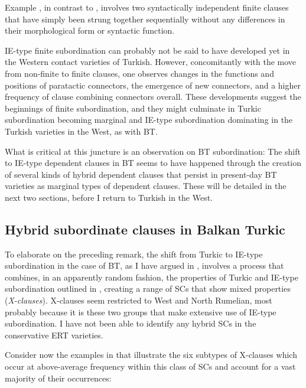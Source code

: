 \documentclass[output=paper,colorlinks,citecolor=brown]{langscibook}
\begin{document}
\noindent
Example , in contrast to , involves two syntactically independent finite clauses that have simply been strung together sequentially without any differences in their morphological form or syntactic function.

IE-type finite subordination can probably not be said to have developed yet in the Western contact varieties of Turkish. However, concomitantly with the move from non-finite to finite clauses, one observes changes in the functions and positions of paratactic connectors, the emergence of new connectors, and a higher frequency of clause combining connectors overall. These developments suggest the beginnings of finite subordination, and they might culminate in Turkic subordination becoming marginal and IE-type subordination dominating in the Turkish varieties in the West, as with BT. 

What is critical at this juncture is an observation on BT subordination: The shift to IE-type dependent clauses in BT seems to have happened through the creation of several kinds of hybrid dependent clauses that persist in present-day BT varieties as marginal types of dependent clauses. These will be detailed in the next two sections, before I return to Turkish in the West.

\subsection{Hybrid subordinate clauses in Balkan Turkic}
\label{sec:keskin:hyb_BT}

To elaborate on the preceding remark, the shift from Turkic to IE-type subordination in the case of BT, as I have argued in \citet{Keskin.transientBT}, involves a process that combines, in an apparently random fashion, the properties of Turkic and IE-type subordination outlined in , creating a range of SCs that show mixed properties (\textit{X-clauses}). X-clauses seem restricted to West and North Rumelian, most probably because it is these two groups that make extensive use of IE-type subordination. I have not been able to identify any hybrid SCs in the conservative ERT varieties. 

Consider now the examples in  that illustrate the six subtypes of X-clauses which occur at above-average frequency within this class of SCs and account for a vast majority of their occurrences:
\end{document}

